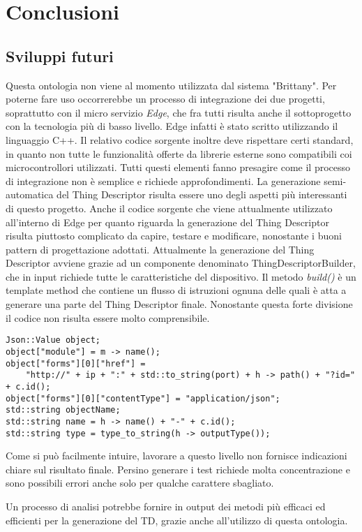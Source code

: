 \section{Conclusioni}
\subsection{Sviluppi futuri}
Questa ontologia non viene al momento utilizzata dal sistema "Brittany". Per poterne fare uso occorrerebbe un processo di integrazione dei due progetti, soprattutto con il micro servizio \textit{Edge}, che fra tutti risulta anche il sottoprogetto con la tecnologia più di basso livello. Edge infatti è stato scritto utilizzando il linguaggio C++. Il relativo codice sorgente inoltre deve rispettare certi standard, in quanto non tutte le funzionalità offerte da librerie esterne sono compatibili coi microcontrollori utilizzati. Tutti questi elementi fanno presagire come il processo di integrazione non è semplice e richiede approfondimenti.\newline\newline
\noindent La generazione semi-automatica del Thing Descriptor risulta essere uno degli aspetti più interessanti di questo progetto. Anche il codice sorgente che viene attualmente utilizzato all'interno di Edge per quanto riguarda la generazione del Thing Descriptor risulta piuttosto complicato da capire, testare e modificare, nonostante i buoni pattern di progettazione adottati.\newline
Attualmente la generazione del Thing Descriptor avviene grazie ad un componente denominato ThingDescriptorBuilder, che in input richiede tutte le caratteristiche del dispositivo. Il metodo \textit{build()} è un template method che contiene un flusso di istruzioni ognuna delle quali è atta a generare una parte del Thing Descriptor finale. Nonostante questa forte divisione il codice non risulta essere molto comprensibile.
\begin{info}[Esempio]
\begin{verbatim}
Json::Value object;
object["module"] = m -> name();
object["forms"][0]["href"] =
	"http://" + ip + ":" + std::to_string(port) + h -> path() + "?id=" + c.id();
object["forms"][0]["contentType"] = "application/json";
std::string objectName;
std::string name = h -> name() + "-" + c.id();
std::string type = type_to_string(h -> outputType());
\end{verbatim}

\noindent Come si può facilmente intuire, lavorare a questo livello non fornisce indicazioni chiare sul risultato finale. Persino generare i test richiede molta concentrazione e sono possibili errori anche solo per qualche carattere sbagliato.
\end{info}

\noindent Un processo di analisi potrebbe fornire in output dei metodi più efficaci ed efficienti per la generazione del TD, grazie anche all'utilizzo di questa ontologia.\newline
